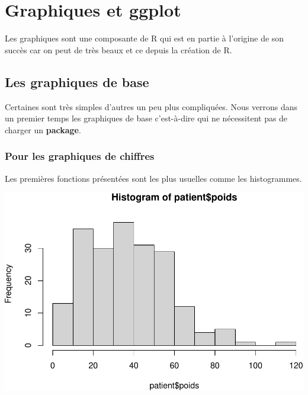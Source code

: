 \documentclass[
]{book}
\newenvironment{Shaded}{\begin{snugshade}}{\end{snugshade}}
\newcommand{\FunctionTok}[1]{\textcolor[rgb]{0.13,0.29,0.53}{\textbf{#1}}}
\newcommand{\NormalTok}[1]{#1}
\newcommand{\SpecialCharTok}[1]{\textcolor[rgb]{0.81,0.36,0.00}{\textbf{#1}}}
\begin{document}
\chapter{Graphiques et ggplot}\label{graphiques-et-ggplot}

Les graphiques sont une composante de R qui est en partie à l'origine de son
succès car on peut de très beaux et ce depuis la création de R.

\section{Les graphiques de base}\label{les-graphiques-de-base}

Certaines sont très simples d'autres un peu plus compliquées. Nous verrons dans
un premier temps les graphiques de base c'est-à-dire qui ne nécessitent pas de
charger un \textbf{package}.

\subsection{Pour les graphiques de chiffres}\label{pour-les-graphiques-de-chiffres}

Les premières fonctions présentées sont les plus usuelles comme les histogrammes.

\begin{Shaded}
\end{Shaded}

\includegraphics{_main_files/figure-latex/poids1-1.pdf}
\end{document}

